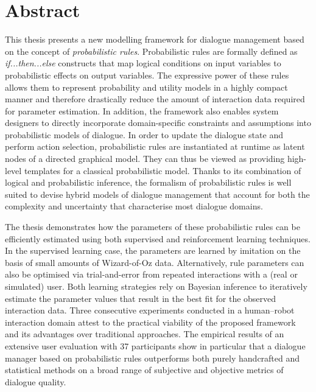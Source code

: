 \chapter*{Abstract}

This thesis presents a new modelling framework for dialogue management based on the concept of \textit{probabilistic rules}.  Probabilistic rules are formally defined as \textit{if...then...else} constructs that map logical conditions on input variables to probabilistic effects on output variables. The expressive power of these rules allows them to represent probability and utility models in a highly compact manner and therefore drastically reduce the amount of interaction data required for parameter estimation. In addition, the framework also enables system designers to directly incorporate domain-specific constraints and assumptions into probabilistic models of dialogue.  In order to update the dialogue state and perform action selection, probabilistic rules are instantiated at runtime as latent nodes of a directed graphical model.  They can thus be viewed as providing high-level templates for a classical probabilistic model. Thanks to its combination of logical and probabilistic inference, the formalism of probabilistic rules is well suited to devise hybrid models of dialogue management that account for both the complexity and uncertainty that characterise most dialogue domains.

The thesis demonstrates how the parameters of these probabilistic rules can be efficiently estimated using both supervised and reinforcement learning techniques. In the supervised learning case, the parameters are learned by imitation on the basis of small amounts of Wizard-of-Oz data.  Alternatively, rule parameters can also be optimised via trial-and-error from repeated interactions with a (real or simulated) user. Both learning strategies rely on Bayesian inference to iteratively estimate the parameter values that result in the best fit for the observed interaction data. Three consecutive experiments conducted in a human--robot interaction domain attest to the practical viability of the proposed framework and its advantages over traditional approaches.  The empirical results of an extensive user evaluation with 37 participants show in particular that a dialogue manager based on probabilistic rules outperforms both purely handcrafted and statistical methods on a broad range of subjective and objective metrics of dialogue quality.

